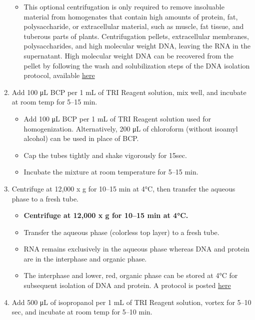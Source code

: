 \documentclass[
  letterpaper,
  DIV=11,
  numbers=noendperiod]{scrreprt}
\providecommand{\tightlist}{%
  \setlength{\itemsep}{0pt}\setlength{\parskip}{0pt}}\usepackage{longtable,booktabs,array}
\begin{document}
\begin{enumerate}
  \begin{itemize}
  \tightlist
  \item
    This optional centrifugation is only required to remove insoluable
    material from homogenates that contain high amounts of protein, fat,
    polysaccharide, or extracellular material, such as muscle, fat
    tissue, and tuberous parts of plants. Centrifugation pellets,
    extracellular membranes, polysaccharides, and high molecular weight
    DNA, leaving the RNA in the supernatant. High molecular weight DNA
    can be recovered from the pellet by following the wash and
    solubilization steps of the DNA isolation protocol, available
    \href{https://drk-lo.github.io/lotterhoslabprotocols/molecprot_rnaextraction/www.ambion.com/techlib/append/supp.}{here}
  \end{itemize}
\item
  Add 100 μL BCP per 1 mL of TRI Reagent solution, mix well, and
  incubate at room temp for 5--15 min.

  \begin{itemize}
  \item
    Add 100 μL BCP per 1 mL of TRI Reagent solution used for
    homogenization. Alternatively, 200 μL of chloroform (without isoamyl
    alcohol) can be used in place of BCP.
  \item
    Cap the tubes tightly and shake vigorously for 15sec.
  \item
    Incubate the mixture at room temperature for 5--15 min.
  \end{itemize}
\item
  Centrifuge at 12,000 x g for 10--15 min at 4°C, then transfer the
  aqueous phase to a fresh tube.

  \begin{itemize}
  \item
    \textbf{Centrifuge at 12,000 x g for 10--15 min at 4°C.}
  \item
    Transfer the aqueous phase (colorless top layer) to a fresh tube.
  \item
    RNA remains exclusively in the aqueous phase whereas DNA and protein
    are in the interphase and organic phase.
  \item
    The interphase and lower, red, organic phase can be stored at 4°C
    for subsequent isolation of DNA and protein. A protocol is posted
    \href{https://drk-lo.github.io/lotterhoslabprotocols/molecprot_rnaextraction/www.ambion.com/techlib/append/supp}{here}
  \end{itemize}
\item
  Add 500 μL of isopropanol per 1 mL of TRI Reagent solution, vortex for
  5--10 sec, and incubate at room temp for 5--10 min.


\end{enumerate}
\end{document}
